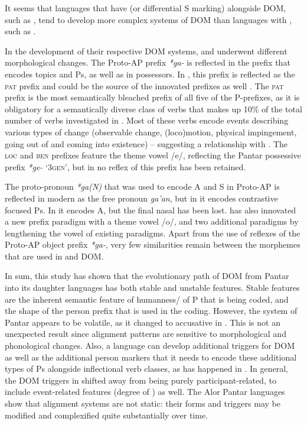 \documentclass[output=paper]{LSP/langsci}
\begin{document}
It seems that languages that have  (or differential S marking) alongside DOM, such as , tend to develop more complex systems of DOM than languages with , such as .

In the development of their respective DOM systems,  and  underwent different morphological changes. The Proto-AP prefix \textit{*ga-} is reflected in the  prefix that encodes topics and  Ps, as well as in  possessors. In , this prefix is reflected as the \textsc{pat} prefix and could be the source of the innovated prefixes as well \citep{Klameretal2012Role}. The \textsc{pat} prefix is the most semantically bleached prefix of all five of the  P-prefixes, as it is obligatory for a semantically diverse class of verbs that makes up 10\% of the total number of verbs investigated in . Most of these verbs encode events describing various types of change (observable change, (loco)motion, physical impingement, going out of and coming into existence) – suggesting a relationship with . The  \textsc{loc} and \textsc{ben} prefixes feature the theme vowel /e/, reflecting the  Pantar possessive prefix \textit{*ge-} ‘\textsc{3gen}’, but in  no reflex of this prefix has been retained.

The proto-pronoun \textit{*ga(N)} that was used to encode A and S in Proto-AP is reflected in modern  as the free pronoun \textit{ga’an}, but in  it encodes contrastive focused Ps. In  it encodes A, but the final nasal has been lost.  has also innovated a new prefix paradigm with a theme vowel /o/, and two additional paradigms by lengthening the vowel of existing paradigms. Apart from the use of reflexes of the Proto-AP object prefix \textit{*ga-}, very few similarities remain between the morphemes that are used in  and  DOM. 

In sum, this study has shown that the evolutionary path of DOM from  Pantar into its daughter languages has both stable and unstable features. Stable features are the inherent semantic feature of humanness/ of P that is being coded, and the shape of the person prefix that is used in the coding. However, the  system of  Pantar appears to be volatile, as it changed to accusative in . This is not an unexpected result since alignment patterns are sensitive to morphological and phonological changes. Also, a language can develop additional triggers for DOM as well as the additional person markers that it needs to encode these additional types of Ps alongside inflectional verb classes, as has happened in . In general, the DOM triggers in  shifted away from being purely participant-related, to include event-related features (degree of ) as well.  The Alor Pantar languages show that alignment systems are not static: their forms and triggers may be modified and complexified quite substantially over time. 
\end{document}
